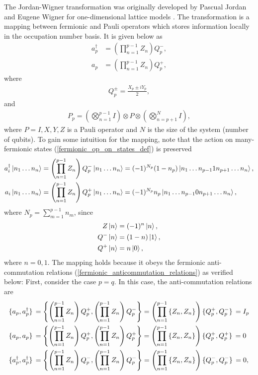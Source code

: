 \documentclass[10pt]{article}
\newcommand{\dagg}[1]{{#1^{\dagger}}}
\begin{document}
The Jordan-Wigner transformation was originally developed by Pascual Jordan and Eugene Wigner for one-dimensional lattice models \cite{ref:jwt}. The transformation is a mapping between fermionic and Pauli operators which stores information locally in the occupation number basis. It is given below as
\begin{align}
\label{jwt}
a^\dagger_p&=\left(\prod_{n=1}^{p-1}Z_n\right)Q^-_p,
\\
a_p&=\left(\prod_{n=1}^{p-1}Z_n\right)Q^+_p
,\end{align}
where
\begin{align}
Q^{\pm}_p
=
\frac{X_p \pm i Y_p}{2}
,\end{align}
and
\begin{align}
P_p = \left(\bigotimes_{n=1}^{p-1}I\right)\otimes P \otimes \left(\bigotimes_{n=p+1}^{N}I\right)
,\end{align}
where $P=I,X,Y,Z$ is a Pauli operator and $N$ is the size of the system (number of qubits). To gain some intuition for the mapping, note that the action on many-fermionic states (\ref{fermionic_op_on_states_def}) is preserved
\begin{align}
\dagg{a_i}\ket{n_1\ldots n_n}
&=
\left(\prod_{n=1}^{p-1}Z_n\right)Q^-_p\ket{n_1\ldots n_n}
=
(-1)^{N_p}(1-n_p)\ket{n_1\ldots n_{p-1}1n_{p+1}\ldots n_n},
\\
a_i\ket{n_1\ldots n_n}
&=
\left(\prod_{n=1}^{p-1}Z_n\right)Q^+_p\ket{n_1\ldots n_n}
=
(-1)^{N_p}n_p\ket{n_1\ldots n_{p-1}0n_{p+1}\ldots n_n},
\end{align}
where $N_p=\sum_{m=1}^{p-1}n_m$, since
\begin{align}
Z\ket{n}&=(-1)^n\ket{n},
\\
Q^-\ket{n}&=(1-n)\ket{1},
\\
Q^+\ket{n}&=n\ket{0},
\end{align}
where $n=0,1$. The mapping holds because it obeys the fermionic anti-commutation relations (\ref{fermionic_anticommutation_relations}) as verified below: First, consider the case $p=q$. In this case, the anti-commutation relations are
\begin{align}
\acomm*{a_p}{a^\dagger_p}
&=
\acomm{\left(\prod_{n=1}^{p-1}Z_n\right)Q^+_p}{\left(\prod_{n=1}^{p-1}Z_n\right)Q^-_p}
=
\left(\prod_{n=1}^{p-1}\acomm{Z_n}{Z_n}\right)
\acomm*{Q^+_p}{Q^-_p}
=
I_p
\\
\acomm*{a_p}{a_p}
&=
\acomm{\left(\prod_{n=1}^{p-1}Z_n\right)Q^+_p}{\left(\prod_{n=1}^{p-1}Z_n\right)Q^+_p}
=
\left(\prod_{n=1}^{p-1}\acomm{Z_n}{Z_n}\right)
\acomm*{Q^+_p}{Q^+_p}
=
0
\\
\acomm*{a^\dagger_p}{a^\dagger_p}
&=
\acomm{\left(\prod_{n=1}^{p-1}Z_n\right)Q^-_p}{\left(\prod_{n=1}^{p-1}Z_n\right)Q^-_p}
=
\left(\prod_{n=1}^{p-1}\acomm{Z_n}{Z_n}\right)
\acomm*{Q^-_p}{Q^-_p}
=
0,
\end{align}
\end{document}
